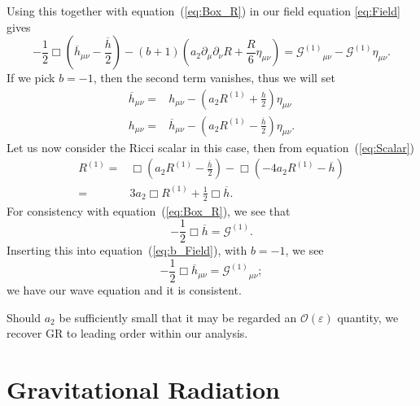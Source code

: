 \documentclass[a4paper, 11pt, titlepage, twoside]{report}
\newcommand{\eqnref}[1]{equation~(\ref{eq:#1})}
\newcommand{\recip}[1]{\ensuremath{\frac{1}{#1}}}
\newcommand{\order}[1]{\ensuremath{\mathcal{O}({#1})}}
\begin{document}
Using this together with \eqnref{Box_R} in our field equation \eqref{eq:Field} gives
\begin{equation}
-\frac{1}{2}\Box\left(\overline{h}_{\mu\nu} - \frac{\overline{h}}{2}\right) - (b + 1)\left(a_2\partial_\mu\partial_\nu R + \frac{R}{6}\eta_{\mu\nu}\right) = {\mathcal{G}^{(1)}}_{\mu\nu} - \mathcal{G}^{(1)}\eta_{\mu\nu}.
\label{eq:b_Field}
\end{equation}
If we pick $b = -1$, then the second term vanishes, thus we will set\cite{Corda2007, Capozziello2008}
\begin{align}
\overline{h}_{\mu\nu} = {} & h_{\mu\nu} - \left(a_2 R^{(1)} + \frac{h}{2}\right)\eta_{\mu\nu}\\
h_{\mu\nu} = {} & \overline{h}_{\mu\nu} - \left(a_2 R^{(1)} -\frac{\overline{h}}{2}\right)\eta_{\mu\nu}.
\label{eq:h_metric}
\end{align}
Let us now consider the Ricci scalar in this case, then from \eqnref{Scalar}
\begin{align}
R^{(1)} = {} & \Box \left(a_2 R^{(1)} -\frac{\overline{h}}{2}\right) - \Box (-4 a_2 R^{(1)} - \overline{h}) \nonumber \\
 = {} & 3a_2 \Box R^{(1)} + \frac{1}{2}\Box \overline{h}.
\label{eq:Ricci_Box_h}
\end{align}
For consistency with \eqnref{Box_R}, we see that
\begin{equation}
-\recip{2}\Box \overline{h} = \mathcal{G}^{(1)}.
\label{eq:Box_h}
\end{equation}
Inserting this into \eqnref{b_Field}, with $b = -1$, we see
\begin{equation}
-\recip{2}\Box \overline{h}_{\mu\nu} = {\mathcal{G}^{(1)}}_{\mu\nu};
\label{eq:Box_hmunu}
\end{equation}
we have our wave equation and it is consistent.

Should $a_2$ be sufficiently small that it may be regarded an $\order{\varepsilon}$ quantity, we recover GR to leading order within our analysis.

\section{Gravitational Radiation}
\end{document}
